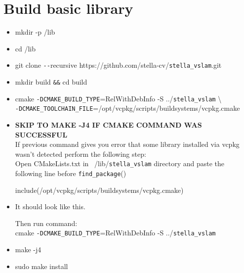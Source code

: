 \documentclass[a4paper,12pt]{book}
\begin{document}
\section{Build basic library}
\begin{itemize}
	\item mkdir -p \texttildelow/lib
	\item cd \texttildelow/lib
	\item git clone \texttt{-{}-}recursive https://github.com/stella-cv/\verb|stella_vslam|.git
	\item mkdir build \verb|&&| cd build
	\item cmake \verb|-DCMAKE_BUILD_TYPE|=RelWithDebInfo -S ../\verb|stella_vslam| \textbackslash \\ \verb|-DCMAKE_TOOLCHAIN_FILE|=/opt/vcpkg/scripts/buildsystems/vcpkg.cmake
	\item \textbf{SKIP TO MAKE -J4 IF CMAKE COMMAND WAS SUCCESSFUL}\\
	If previous command gives you error that some library installed via vcpkg wasn't detected perform the following step:\\
	Open CMakeLists.txt in ~/lib/\verb|stella_vslam| directory and paste the following line before \verb|find_package|()
	
	\vspace{1mm}
	include(/opt/vcpkg/scripts/buildsystems/vcpkg.cmake)
	\item \begin{minipage}[t]{\linewidth}
		\raggedright
		
		\medskip
		It should look like this. 
	\end{minipage}
	
	Then run command: \\
	cmake \verb|-DCMAKE_BUILD_TYPE|=RelWithDebInfo -S ../\verb|stella_vslam|
	\item make -j4
	\item sudo make install
\end{itemize}
\end{document}

